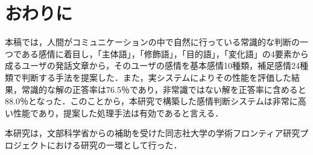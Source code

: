 \documentclass[japanese]{jnlp_1.3a}
\begin{document}
\section{おわりに}
本稿では，人間がコミュニケーションの中で自然に行っている常識的な判断の一つである感情に着目し，「主体語」，「修飾語」，「目的語」，「変化語」の4要素から成るユーザの発話文章から，そのユーザの感情を基本感情10種類，補足感情24種類で判断する手法を提案した．また，実システムによりその性能を評価した結果，常識的な解の正答率は76.5{\kern0pt}％であり，非常識ではない解を正答率に含めると88.0{\kern0pt}％となった．このことから，本研究で構築した感情判断システムは非常に高い性能であり，提案した処理手法は有効であると言える．

\vspace{0.5\baselineskip}

\acknowledgment

本研究は，文部科学省からの補助を受けた同志社大学の学術フロンティア研究プロジェクトにおける研究の一環として行った．




\vspace{0.5\baselineskip}
\end{document}
